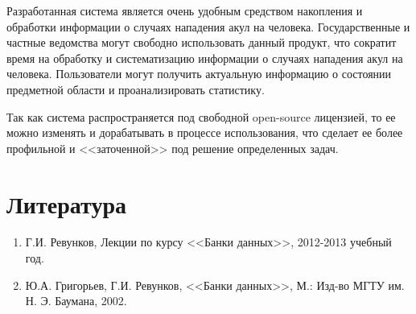 \documentclass[russian,utf8,simple,emptystyle]{eskdtext}
\begin{document}
Разработанная система является очень удобным средством накопления и обработки информации о случаях нападения акул на человека. Государственные и частные ведомства могут свободно использовать данный продукт, что сократит время на обработку и систематизацию информации о случаях нападения акул на человека. Пользователи могут получить актуальную информацию о состоянии предметной области и проанализировать статистику.

Так как система распространяется под свободной open-source лицензией, то ее можно изменять и дорабатывать в процессе использования, что сделает ее более профильной и <<заточенной>>  под решение определенных задач.

\section{Литература}
\begin{enumerate}
\item Г.И. Ревунков, Лекции по курсу <<Банки данных>>, 2012-2013 учебный год.
\item Ю.А. Григорьев, Г.И. Ревунков, <<Банки данных>>, М.: Изд-во МГТУ им. Н. Э. Баумана, 2002.
\end{enumerate}
\end{document}
